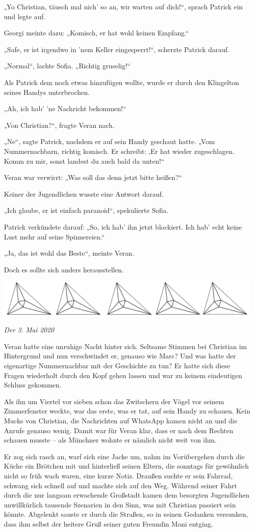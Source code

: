 \documentclass[oneside]{memoir}
\newcommand{\parasep}{
\bigskip
\bigskip
\begin{center} 
   \includegraphics[scale=.08]{parasep5.jpg} 
\end{center}
\bigskip
\bigskip
}
\begin{document}
„Yo Christian, täusch mal nich' so an, wir warten auf dich!“, sprach Patrick ein und legte auf.

Georgi meinte dazu: „Komisch, er hat wohl keinen Empfang.“

„Safe, er ist irgendwo in 'nem Keller eingesperrt!“, scherzte Patrick darauf.

„Normal“, lachte Sofia. „Richtig gruselig!“

Als Patrick dem noch etwas hinzufügen wollte, wurde er durch den Klingelton seines Handys unterbrochen.

„Ah, ich hab' 'ne Nachricht bekommen!“

„Von Christian?“, fragte Veran nach.

„Ne“, sagte Patrick, nachdem er auf sein Handy geschaut hatte. „Vom Nummernachbarn, richtig komisch. Er schreibt: ‚Er hat wieder zugeschlagen. Komm zu mir, sonst landest du auch bald da unten!\grq“

Veran war verwirrt: „Was soll das denn jetzt bitte heißen?“

Keiner der Jugendlichen wusste eine Antwort darauf.

„Ich glaube, er ist einfach paranoid“, spekulierte Sofia.

Patrick verkündete darauf: „So, ich hab' ihn jetzt blockiert. Ich hab' echt keine Lust mehr auf seine Spinnereien.“

„Ja, das ist wohl das Beste“, meinte Veran.

Doch es sollte sich anders herausstellen.
     
\parasep

\textit{Der 3. Mai 2020}

Veran hatte eine unruhige Nacht hinter sich. Seltsame Stimmen bei Christian im Hintergrund und nun verschwindet er, genauso wie Marc? Und was hatte der eigenartige Nummernachbar mit der Geschichte zu tun? Er hatte sich diese Fragen wiederholt durch den Kopf gehen lassen und war zu keinem eindeutigen Schluss gekommen.

Als ihn um Viertel vor sieben schon das Zwitschern der Vögel vor seinem Zimmerfenster weckte, war das erste, was er tat, auf sein Handy zu schauen. Kein Mucks von Christian, die Nachrichten auf WhatsApp kamen nicht an und die Anrufe genauso wenig. Damit war für Veran klar, dass er nach dem Rechten schauen musste -- als Münchner wohnte er nämlich nicht weit von ihm.

Er zog sich rasch an, warf sich eine Jacke um, nahm im Vorübergehen durch die Küche ein Brötchen mit und hinterließ seinen Eltern, die sonntags für gewöhnlich nicht so früh wach waren, eine kurze Notiz. Draußen suchte er sein Fahrrad, schwang sich schnell auf und machte sich auf den Weg. Während seiner Fahrt durch die nur langsam erwachende Großstadt kamen dem besorgten Jugendlichen unwillkürlich tausende Szenarien in den Sinn, was mit Christian passiert sein könnte. Abgelenkt sauste er durch die Straßen, so in seinen Gedanken versunken, dass ihm selbst der heitere Gruß seiner guten Freundin Moni entging.
\end{document}
